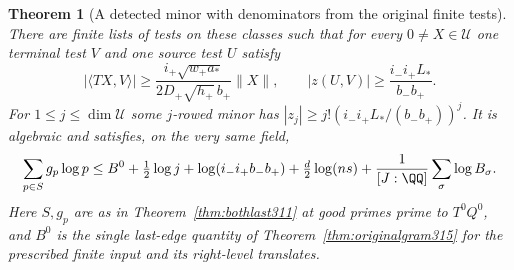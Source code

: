 \documentclass[a4paper,11pt]{article}
\newtheorem{theorem}[proposition]{Theorem}
\theoremstyle{definition}
\theoremstyle{remark}
\numberwithin{equation}{section}
\begin{document}
\begin{theorem}[A detected minor with denominators from the original finite tests]\leavevmode
\label{thm:intrinsicminor315}
There are finite lists of tests on these classes such that for
every \(0\ne X\in\mathcal U\) one terminal test \(V\) and one
source test \(U\) satisfy
\[
 |\langle TX,V\rangle|\ge
 \frac{i_+\sqrt{w_+a_*}}{2D_+\sqrt{h_+}\,b_+}\|X\|,
 \qquad |z(U,V)|\ge\frac{i_-i_+ L_*}{b_-b_+}.
\]
For \(1\le j\le\dim\mathcal U\) some \(j\)-rowed minor has
\(\displaystyle |z_j|\ge j!(i_-i_+L_*/(b_-b_+))^j\).
It is algebraic and satisfies, on the very same field,
\[
 \sum_{p\in S}g_p\log p
 \le B^0+\tfrac12\log j+\log(i_-i_+b_-b_+)
       +\tfrac d2\log(ns)+\frac1{[J:\QQ]}\sum_\sigma\log B_\sigma .
\]
Here \(S,g_p\) are as in Theorem~\ref{thm:bothlast311} at good
primes prime to \(T^0Q^0\), and \(B^0\) is the single last-edge
quantity of Theorem~\ref{thm:originalgram315} for the prescribed
finite input and its right-level translates.
\end{theorem}
\end{document}
